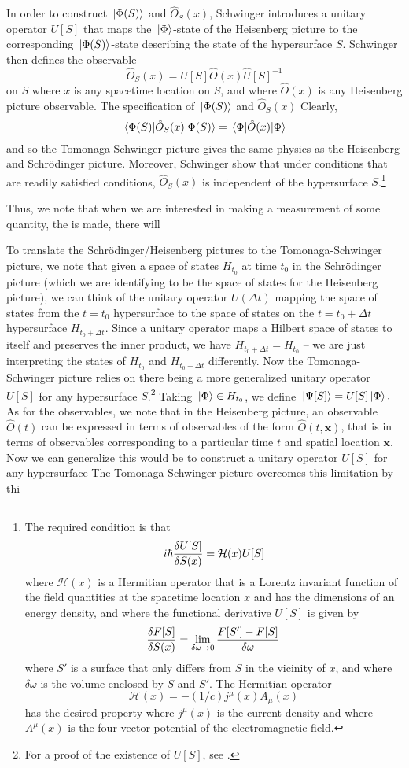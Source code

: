 In order to construct $\ket*{\Phi(S)}$ and $\hat{O}_S(x)$, Schwinger introduces a unitary operator $U[S]$ that maps the $\ket*{\Phi}$-state of the Heisenberg picture to the corresponding $\ket*{\Phi(S)}$-state describing the state of the hypersurface $S$. Schwinger then defines the observable  
$$\hat{O}_S(x)=U[S]\hat{O}(x)\hat{U}[S]^{-1}$$
on $S$ where $x$ is any spacetime location on $S$, and where $\hat{O}(x)$ is any Heisenberg picture observable. The specification of $\ket*{\Phi(S)}$ and $\hat{O}_S(x)$ Clearly, 
$$\ev*{\hat{O}_S(x)}{\Phi(S)}=\ev*{\hat{O}(x)}{\Phi}$$
and so the Tomonaga-Schwinger picture gives the same physics as the Heisenberg and Schr\"{o}dinger picture. Moreover, Schwinger show that under conditions that are readily satisfied conditions, $\hat{O}_S(x)$ is independent of the hypersurface $S$.\footnote{
  The required condition is that 
  $$i\hbar\fdv{U[S]}{S(x)}=\mathcal{H}(x)U[S] $$
  where $\mathcal{H}(x)$ is a Hermitian operator that is a Lorentz invariant function of the field quantities at the spacetime location $x$ and has the dimensions of an energy density, and where the functional derivative $U[S]$ is given by
  $$\fdv{F[S]}{S(x)}=\lim_{\delta \omega\rightarrow 0}\frac{F[S']-F[S]}{\delta\omega} $$
  where $S'$ is a surface that only differs from $S$ in the vicinity of $x$, and where $\delta\omega$ is the volume enclosed by $S$ and $S'$. The Hermitian operator $$\mathcal{H}(x)=-(1/c)j^\mu(x)A_\mu(x)$$
  has the desired property where $j^\mu(x)$ is the current density and where $A^\mu(x)$ is the four-vector potential of the electromagnetic field.}

Thus, we note that when we are interested in making a measurement of some quantity, the  is made, there will

To translate the Schr\"{o}dinger/Heisenberg pictures to the Tomonaga-Schwinger picture, we note that given a space of states $H_{t_0}$ at time $t_0$ in the  Schr\"{o}dinger picture (which we are identifying to be the space of states for the Heisenberg picture), we can think of the unitary operator $U(\Delta t)$ mapping the space of states from the $t=t_0$ hypersurface to the space of states on the $t=t_0+\Delta t$ hypersurface $H_{t_0+\Delta t}$. Since a unitary operator maps a Hilbert space of states to itself and preserves the inner product, we have $H_{t_0+\Delta t}=H_{t_0}$ -- we are just interpreting the states of $H_{t_0}$ and $H_{t_0+\Delta t}$ differently. Now the Tomonaga-Schwinger picture relies on there being a more generalized unitary operator $U[S]$ for any hypersurface $S$.\footnote{For a proof of the existence of $U[S]$, see \cite[p. 1445]{SchwingerJulianI}.}  Taking $\ket*{\Phi}\in H_{t_0}$, we define $\ket*{\Psi[S]}=U[S]\ket*{\Phi}.$ As for the observables, we note that in the Heisenberg picture, an observable $\hat{O}(t)$ can be expressed in terms of observables of the form $\hat{O}(t, \bm{x})$, that is in terms of observables corresponding to a particular time $t$ and spatial location $\bm{x}$. 
Now we can generalize this would be to construct a unitary operator $U[S]$ for any hypersurface 
The Tomonaga-Schwinger picture overcomes this limitation by thi

